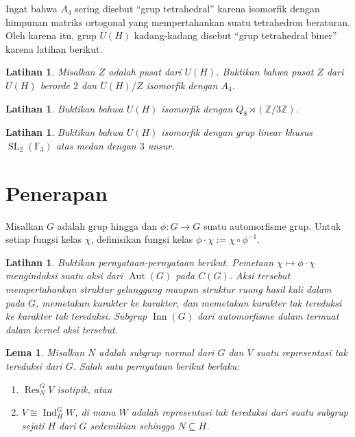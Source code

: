 \documentclass[12pt]{article}
\theoremstyle{plain}
\newtheorem{lemma}[theorem]{Lema}
\newtheorem{exercise}[theorem]{Latihan}
\theoremstyle{definition}
\theoremstyle{remark}
\numberwithin{equation}{section}
\begin{document}
Ingat bahwa $A_4$ sering disebut ``grup tetrahedral''
karena isomorfik dengan himpunan matriks ortogonal yang mempertahankan suatu
tetrahedron beraturan.
Oleh karena itu, grup $U(H)$ kadang-kadang disebut ``grup tetrahedral biner''
karena latihan berikut.

\begin{exercise}
Misalkan $Z$ adalah pusat dari $U(H)$.
Buktikan bahwa pusat $Z$ dari $U(H)$ berorde $2$ dan
$U(H)/Z $ isomorfik dengan $A_4$.
\end{exercise}


\begin{exercise}
Buktikan bahwa $U(H)$ isomorfik dengan $Q_8 \rtimes (\mathbb{Z}/3\mathbb{Z})$.
\end{exercise}

\begin{exercise}
Buktikan bahwa $U(H)$ isomorfik dengan grup linear khusus
$\operatorname{SL}_2(\mathbb{F}_3)$ atas medan dengan $3$ unsur.
\end{exercise}

\section{Penerapan}

Misalkan $G$ adalah grup hingga dan $\phi: G \to G$
suatu automorfisme grup. Untuk setiap fungsi kelas $\chi$,
definisikan fungsi kelas $\phi \cdot \chi := \chi \circ \phi^{-1}$.

\begin{exercise}
Buktikan pernyataan-pernyataan berikut.
Pemetaan $\chi \mapsto \phi \cdot \chi$ menginduksi suatu aksi
dari $\operatorname{Aut}(G)$ pada $C(G)$.
Aksi tersebut mempertahankan struktur gelanggang maupun struktur ruang hasil kali dalam pada
$G$, memetakan karakter ke karakter,
dan memetakan karakter tak tereduksi ke karakter tak tereduksi.
Subgrup $\operatorname{Inn}(G)$ dari automorfisme dalam termuat dalam
kernel aksi tersebut.
\end{exercise}

\begin{lemma} \label{lem:normal_restriction}
Misalkan $N$ adalah subgrup normal dari $G$ dan $V$
suatu representasi tak tereduksi dari $G$. Salah satu pernyataan berikut berlaku:
\begin{enumerate}
\item $\operatorname{Res}^G_N V$ isotipik, atau
\item $V \cong \operatorname{Ind}^G_H W$, di mana $W$ adalah representasi tak tereduksi
dari suatu subgrup sejati $H$ dari $G$ sedemikian sehingga $N
\subseteq H$.
\end{enumerate}
\end{lemma}
\end{document}
